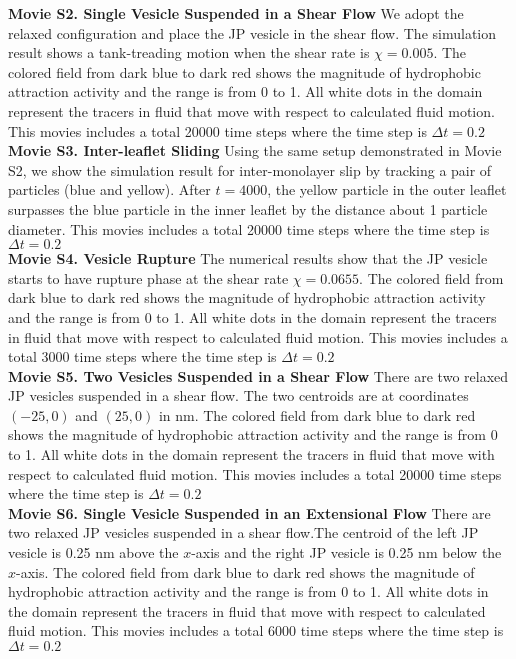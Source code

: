\noindent
{\bf Movie S2. Single Vesicle Suspended in a Shear Flow} 
We adopt the relaxed configuration and place the JP vesicle in the shear flow. The simulation result shows a tank-treading motion when the shear rate is $\chi=0.005$.
The colored field from dark blue to dark red shows the magnitude of hydrophobic attraction activity and the range is from 0 to 1. All white dots in the domain represent the tracers in fluid that move with respect to calculated fluid motion.
This movies includes a total 20000 time steps where the time step is $\Delta t=0.2$\\

\noindent
{\bf Movie S3. Inter-leaflet Sliding} 
Using the same setup demonstrated in Movie S2, we show the simulation result for 
inter-monolayer slip by tracking a pair of particles (blue and yellow). After $t=4000$, 
the yellow particle in the outer leaflet surpasses the blue particle in the inner leaflet by the distance about 1 particle diameter.
This movies includes a total 20000 time steps where the time step is $\Delta t=0.2$\\


\noindent
{\bf Movie S4. Vesicle Rupture} 
The numerical results show that the JP vesicle starts to have rupture phase at the shear rate $\chi=0.0655$. The colored field from dark blue to dark red shows the magnitude of hydrophobic attraction activity and the range is from 0 to 1. All white dots in the domain represent the tracers in fluid that move with respect to calculated fluid motion. This movies includes a total 3000 time steps where the time step is $\Delta t=0.2$\\


\noindent
{\bf Movie S5. Two Vesicles Suspended in a Shear Flow} 
There are two relaxed JP vesicles suspended in a shear flow. The two centroids are at coordinates $(-25,0)$ and $(25,0)$ in nm. The colored field from dark blue to dark red shows the magnitude of hydrophobic attraction activity and the range is from 0 to 1. All white dots in the domain represent the tracers in fluid that move with respect to calculated fluid motion. This movies includes a total 20000 time steps where the time step is $\Delta t=0.2$\\


\noindent
{\bf Movie S6. Single Vesicle Suspended in an Extensional Flow} 
There are two relaxed JP vesicles suspended in a shear flow.The centroid of the left JP vesicle is 0.25 nm above the $x$-axis and the right JP vesicle is 0.25 nm below the $x$-axis. The colored field from dark blue to dark red shows the magnitude of hydrophobic attraction activity and the range is from 0 to 1. All white dots in the domain represent the tracers in fluid that move with respect to calculated fluid motion.
This movies includes a total 6000 time steps where the time step is $\Delta t=0.2$\\



